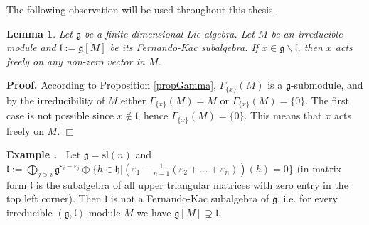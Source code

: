 \documentclass[12pt]{report}
\newenvironment{example}{ \smallskip \addtocounter{theo}{1} \noindent \textbf{Example  \arabic{section}.\arabic{theo}~}}{}%
\newtheorem{lemma}[theo]{Lemma}
\newenvironment{proof}[1][]{ \textbf{Proof#1. }}{$\Box$\medskip}
\newcommand{\hh}{\mathfrak{h}}
\newcommand{\gG}{\mathfrak{g}}
\newcommand{\lL}{\mathfrak{l}}
\newcommand{\refle}[1]{Lemma \ref{#1}}
\newcommand{\refprop}[1]{Proposition \ref{#1}}
\newcommand{\sL}{\mathrm{sl}}
\newcommand{\eps}{\varepsilon}
\begin{document}
The following observation will be used throughout this thesis.
\begin{lemma}\label{leActFree}
Let $\gG$ be a finite-dimensional Lie algebra. Let $M$ be an irreducible module and $\lL:=\gG[M]$ be its Fernando-Kac subalgebra. If $x\in\gG\backslash\lL$, then $x$ acts freely on any non-zero vector in $M$. 
\end{lemma}
\begin{proof}
According to \refprop{propGamma}, $\Gamma_{\{x\}}(M)$ is a $\gG$-submodule, and by the irreducibility of $M$ either $\Gamma_{\{x\}}(M)=M$ or $\Gamma_{\{x\}}(M)=\{0\}$. The first case is not possible since $x\notin \lL$, hence $\Gamma_{\{x\}}(M)=\{0\}$. This means that $x$ acts freely on $M$.
\end{proof}

\begin{example}\label{exFK} Let  $\gG=\sL(n)$ and $\lL:=\bigoplus_{j>i} \gG^{\eps_i-\eps_j}\oplus\{h\in\hh |(\eps_1- \frac{1}{n-1} (\eps_2+ \dots+ \eps_n))(h)=0 \}$ (in matrix form $\lL$ is the subalgebra of all upper triangular matrices with zero entry in the top left corner). Then $\lL$ is not a Fernando-Kac subalgebra of $\gG$, i.e. for every irreducible $(\gG,\lL)$-module $M$ we have $\gG[M]\supsetneq\lL$.  
\end{example}
\end{document}
